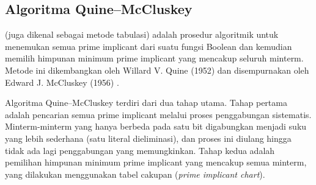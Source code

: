 \subsection{Algoritma Quine--McCluskey}

\begin{definisi}
 (juga dikenal sebagai metode tabulasi) adalah prosedur algoritmik untuk menemukan semua prime implicant dari suatu fungsi Boolean dan kemudian memilih himpunan minimum prime implicant yang mencakup seluruh minterm. Metode ini dikembangkan oleh Willard V. Quine (1952) dan disempurnakan oleh Edward J. McCluskey (1956) \cite{wiki_quine_mccluskey}.
\end{definisi}

Algoritma Quine--McCluskey terdiri dari dua tahap utama. Tahap pertama adalah pencarian semua prime implicant melalui proses penggabungan sistematis. Minterm-minterm yang hanya berbeda pada satu bit digabungkan menjadi suku yang lebih sederhana (satu literal dieliminasi), dan proses ini diulang hingga tidak ada lagi penggabungan yang memungkinkan. Tahap kedua adalah pemilihan himpunan minimum prime implicant yang mencakup semua minterm, yang dilakukan menggunakan tabel cakupan (\textit{prime implicant chart}).


